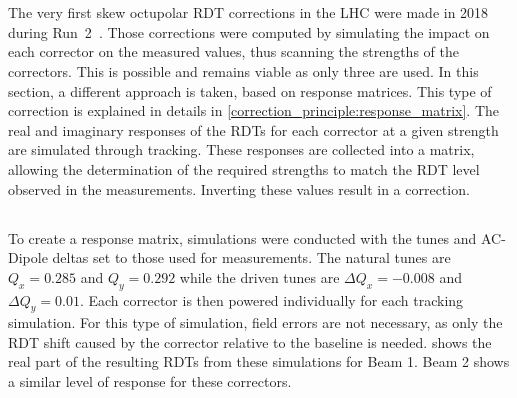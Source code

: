 \section{}

The very first skew octupolar RDT corrections in the LHC were made in 2018 during
Run~2~\cite{carlier_nonlinear_2020}. Those corrections were computed by simulating the impact on
each corrector on the measured values, thus scanning the strengths of the correctors. This is
possible and remains viable as only three are used.
In this section, a different approach is taken, based on response matrices. This type of correction
is explained in details in \cref{correction_principle:response_matrix}. The real and imaginary 
responses of the RDTs for each corrector at a given strength are simulated through tracking.  These
responses are collected into a matrix, allowing the determination of the required strengths to match
the RDT level observed in the measurements. Inverting these values result in a correction.


\subsection{}

To create a response matrix, simulations were conducted with the tunes and AC-Dipole deltas set to
those used for measurements. The natural tunes are $Q_x = 0.285$ and $Q_y = 0.292$ while the driven
tunes are $\Delta Q_x = -0.008$ and $\Delta Q_y = 0.01$.  Each corrector is then powered
individually for each tracking simulation. For this type of simulation, field errors are not
necessary, as only the RDT shift caused by the corrector relative to the baseline is needed.
 shows the real part of the resulting RDTs from these
simulations for Beam 1. Beam 2 shows a similar level of response for these correctors.

